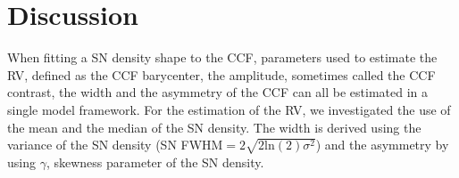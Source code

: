 \documentclass{aa}
\begin{document}


\section{Discussion} \label{sec:discu}

When fitting a SN density shape to the CCF, parameters used to estimate the RV, defined as the CCF barycenter, the amplitude, sometimes called the CCF contrast, the width and the asymmetry of the CCF can all be estimated in a single model framework.
For the estimation of the RV, we investigated the use of the mean and the median of the SN density. 
The width is derived using the variance of the SN density (SN FWHM$=2\sqrt{2\text{ln}(2)\sigma^2}$) and the asymmetry by using $\gamma$, skewness parameter of the SN density.
\end{document}
